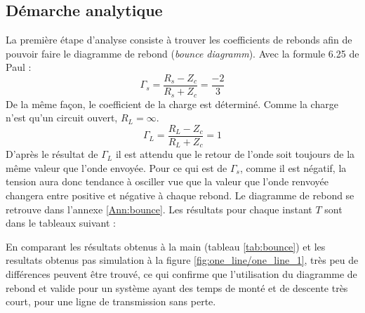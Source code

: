 \subsection{Démarche analytique}
La première étape d'analyse consiste à trouver les coefficients de rebonds afin de pouvoir faire le diagramme de rebond (\textit{bounce diagramm}).
Avec la formule 6.25 de Paul :
\begin{equation}
\Gamma_s = \frac{R_s - Z_c}{R_s + Z_c} = \frac{-2}{3}
\end{equation}
De la même façon, le coefficient de la charge est déterminé.
Comme la charge n'est qu'un circuit ouvert, $R_L = \infty$.
\begin{equation}
\Gamma_L = \frac{R_L - Z_c}{R_L + Z_c} = 1
\end{equation}
D'après le résultat de $\Gamma_L$ il est attendu que le retour de l'onde soit toujours de la même valeur que l'onde envoyée. Pour ce qui est de $\Gamma_s$, comme il est négatif, la tension aura donc tendance à osciller vue que la valeur que l'onde renvoyée changera entre positive et négative à chaque rebond.
Le diagramme de rebond se retrouve dans l'annexe \ref{Ann:bounce}. 
Les résultats pour chaque instant $T$ sont dans le tableaux suivant :



En comparant les résultats obtenus à la main (tableau \ref{tab:bounce}) et les resultats obtenus pas simulation à la figure \ref{fig:one_line/one_line_1}, très peu de différences peuvent être trouvé, ce qui confirme que l'utilisation du diagramme de rebond et valide pour un système ayant des temps de monté et de descente très court, pour une ligne de transmission sans perte.



